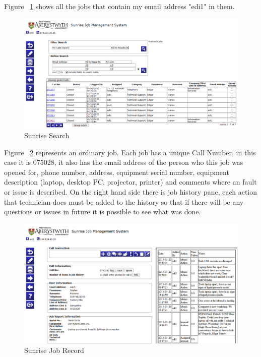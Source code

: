 \documentclass[10pt,a4paper,headinclude=true]{report}
\begin{document}
Figure ~\ref{fig:sunrise_search} shows all the jobs that contain my email address "edi1" in them.

\begin{figure}[H]
\centering
\centerline{\includegraphics[scale=0.4]{./sunrise_search}}
\caption{Sunrise Search}
\label{fig:sunrise_search}
\end{figure}

Figure ~\ref{fig:sunrise_job} represents an ordinary job. Each job has a unique Call Number, in this case it is 075028, it also has the email address of the person who this job was opened for, phone number, address, equipment serial number, equipment description (laptop, desktop PC, projector, printer) and comments where an fault or issue is described. On the right hand side there is job history pane, each action that technician does must be added to the history so that if there will be any questions or issues in future it is possible to see what was done.

\begin{figure}[H]
\centering
\centerline{\includegraphics[scale=0.5]{./sunrise_job}}
\caption{Sunrise Job Record}
\label{fig:sunrise_job}
\end{figure}
\end{document}
